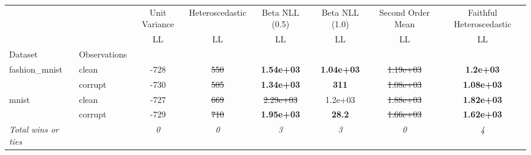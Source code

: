 \begin{tabular}{ll|c|c|c|c|c|c}
\toprule
{} & {} & {Unit Variance} & {Heteroscedastic} & {Beta NLL (0.5)} & {Beta NLL (1.0)} & {Second Order Mean} & {Faithful Heteroscedastic} \\
{} & {} & {LL} & {LL} & {LL} & {LL} & {LL} & {LL} \\
{Dataset} & {Observations} & {} & {} & {} & {} & {} & {} \\
\midrule
\multirow[t]{2}{*}{fashion_mnist} & clean & -728 & \sout{550} & \textbf{1.54e+03} & \textbf{1.04e+03} & \sout{1.19e+03} & \textbf{1.2e+03} \\
 & corrupt & -730 & \sout{505} & \textbf{1.34e+03} & \textbf{311} & \sout{1.08e+03} & \textbf{1.08e+03} \\
\multirow[t]{2}{*}{mnist} & clean & -727 & \sout{669} & \sout{2.29e+03} & 1.2e+03 & \sout{1.88e+03} & \textbf{1.82e+03} \\
 & corrupt & -729 & \sout{710} & \textbf{1.95e+03} & \textbf{28.2} & \sout{1.66e+03} & \textbf{1.62e+03} \\
\textit{{Total wins or ties}} &  & \textit{0} & \textit{0} & \textit{3} & \textit{3} & \textit{0} & \textit{4} \\
\bottomrule
\end{tabular}
